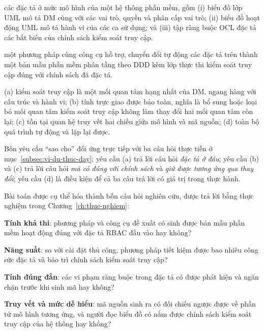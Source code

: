 \begin{description}[leftmargin=2.4em,style=nextline,itemsep=3pt]
  \item[Cho:] các đặc tả ở mức mô hình của một hệ thống phần mềm, gồm (i) biểu đồ lớp UML mô tả DM cùng với các vai trò, quyền và phân cấp vai trò; (ii) biểu đồ hoạt động UML mô tả hành vi của các ca sử dụng; và (iii) tập ràng buộc OCL đặc tả các bất biến của chính sách kiểm soát truy cập.
  \item[Tìm:] một phương pháp cùng công cụ hỗ trợ, chuyển đổi tự động các đặc tả trên thành một bản mẫu phần mềm phân tầng theo DDD kèm lớp thực thi kiểm soát truy cập đúng với chính sách đã đặc tả.
  \item[Sao cho:] (a) kiểm soát truy cập là một mối quan tâm hạng nhất của DM, ngang hàng với cấu trúc và hành vi; (b) tính trực giao được bảo toàn, nghĩa là bổ sung hoặc loại bỏ mối quan tâm kiểm soát truy cập không làm thay đổi hai mối quan tâm còn lại; (c) tồn tại quan hệ truy vết hai chiều giữa mô hình và mã nguồn; (d) toàn bộ quá trình tự động và lặp lại được.
\end{description}

Bốn yêu cầu ``sao cho'' đối ứng trực tiếp với ba câu hỏi thực tiễn ở mục~\ref{subsec:vi-du-thuc-day}: yêu cầu (a) trả lời câu hỏi \emph{đặc tả ở đâu}; yêu cầu (b) và (c) trả lời câu hỏi \emph{mã có đúng với chính sách} và \emph{giữ được tương ứng qua thay đổi}; yêu cầu (d) là điều kiện để cả ba câu trả lời có giá trị trong thực hành.

Bài toán được cụ thể hóa thành bốn câu hỏi nghiên cứu, được trả lời bằng thực nghiệm trong Chương~\ref{ch:thuc-nghiem}:

\begin{description}[leftmargin=3.4em,style=sameline,itemsep=3pt]
  \item[RQ1.] \textbf{Tính khả thi}: phương pháp và công cụ đề xuất có sinh được bản mẫu phần mềm hoạt động đúng với đặc tả RBAC đầu vào hay không?
  \item[RQ2.] \textbf{Năng suất}: so với cài đặt thủ công, phương pháp tiết kiệm được bao nhiêu công sức đặc tả và bảo trì chính sách kiểm soát truy cập?
  \item[RQ3.] \textbf{Tính đúng đắn}: các vi phạm ràng buộc trong đặc tả có được phát hiện và ngăn chặn trước khi sinh mã hay không?
  \item[RQ4.] \textbf{Truy vết và mức dễ hiểu}: mã nguồn sinh ra có đối chiếu ngược được về phần tử mô hình tương ứng, và người đọc biểu đồ có nắm được chính sách kiểm soát truy cập của hệ thống hay không?
\end{description}

